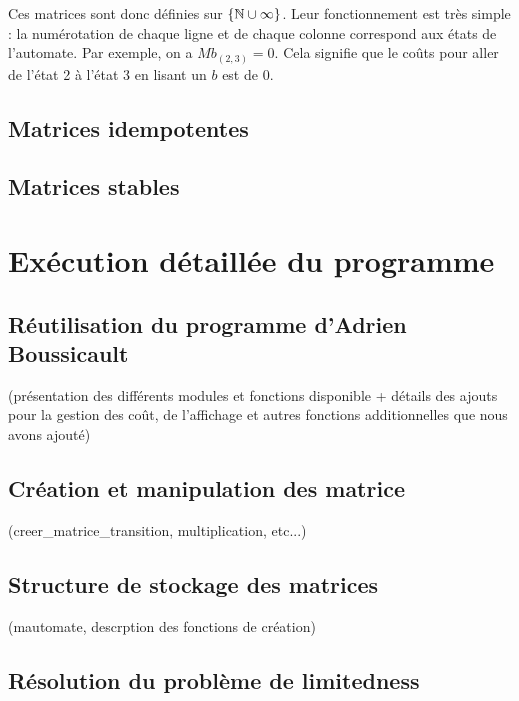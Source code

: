 \documentclass{report}
\begin{document}
Ces matrices sont donc définies sur $\{\mathbb{N} \cup \infty\}$. Leur fonctionnement est très simple : la numérotation de chaque ligne et de chaque colonne correspond aux états de l'automate. Par exemple, on a $Mb_{(2,3)}=0$. Cela signifie que le coûts pour aller de l'état 2 à l'état 3 en lisant un $b$ est de 0. 

\chapter{Matrices idempotentes}

\chapter{Matrices stables}

\part{Exécution détaillée du programme}

\chapter{Réutilisation du programme d'Adrien Boussicault}

(présentation des différents modules et fonctions disponible + détails des ajouts pour la gestion des coût, de l'affichage et autres fonctions additionnelles que nous avons ajouté)

\chapter{Création et manipulation des matrice}

(creer\_matrice\_transition, multiplication, etc...)

\chapter{Structure de stockage des matrices}

(mautomate, descrption des fonctions de création)

\chapter{Résolution du problème de limitedness}



\end{document}
